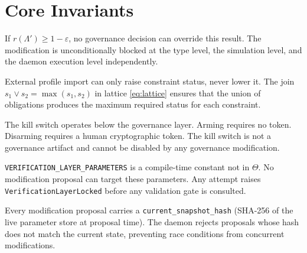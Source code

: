 \documentclass[11pt,letterpaper]{article}
\theoremstyle{remark}
\begin{document}
\section{Core Invariants}

\begin{invariantbox}
If $r(\Lambda') \geq 1 - \varepsilon$, no governance decision can
override this result. The modification is unconditionally blocked
at the type level, the simulation level, and the daemon execution
level independently.
\end{invariantbox}

\begin{invariantbox}
External profile import can only raise constraint status, never lower
it. The join $s_1 \vee s_2 = \max(s_1, s_2)$ in lattice \eqref{eq:lattice}
ensures that the union of obligations produces the maximum required
status for each constraint.
\end{invariantbox}

\begin{invariantbox}
The kill switch operates below the governance layer. Arming requires
no token. Disarming requires a human cryptographic token. The kill
switch is not a governance artifact and cannot be disabled by any
governance modification.
\end{invariantbox}

\begin{invariantbox}
\texttt{VERIFICATION\_LAYER\_PARAMETERS} is a compile-time constant
not in $\Theta$. No modification proposal can target these parameters.
Any attempt raises \texttt{VerificationLayerLocked} before any
validation gate is consulted.
\end{invariantbox}

\begin{invariantbox}
Every modification proposal carries a \texttt{current\_snapshot\_hash}
(SHA-256 of the live parameter store at proposal time). The daemon
rejects proposals whose hash does not match the current state, preventing
race conditions from concurrent modifications.
\end{invariantbox}

\end{document}
